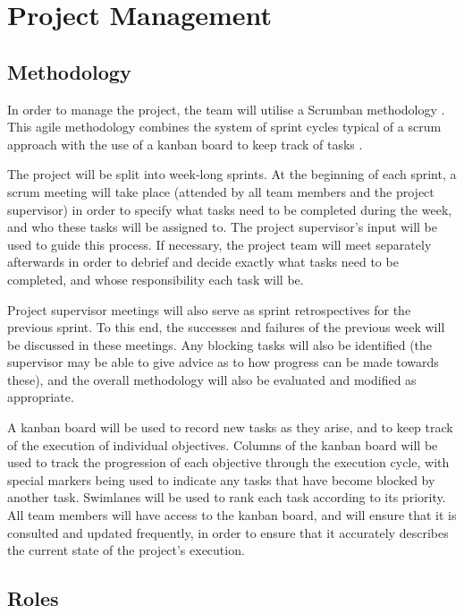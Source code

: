 \chapter{Project Management} %

\section{Methodology}

In order to manage the project, the team will utilise a Scrumban methodology \cite{ladas2009scrumban}. This agile methodology combines the system of sprint cycles typical of a scrum approach with the use of a kanban board to keep track of tasks \cite{scrum2023scrum, kanban2023agile}.  

The project will be split into week-long sprints. At the beginning of each sprint, a scrum meeting will take place (attended by all team members and the project supervisor) in order to specify what tasks need to be completed during the week, and who these tasks will be assigned to. The project supervisor's input will be used to guide this process. If necessary, the project team will meet separately afterwards in order to debrief and decide exactly what tasks need to be completed, and whose responsibility each task will be.

Project supervisor meetings will also serve as sprint retrospectives for the previous sprint. To this end, the successes and failures of the previous week will be discussed in these meetings. Any blocking tasks will also be identified (the supervisor may be able to give advice as to how progress can be made towards these), and the overall methodology will also be evaluated and modified as appropriate.

A kanban board will be used to record new tasks as they arise, and to keep track of the execution of individual objectives. Columns of the kanban board will be used to track the progression of each objective through the execution cycle, with special markers being used to indicate any tasks that have become blocked by another task. Swimlanes will be used to rank each task according to its priority. All team members will have access to the kanban board, and will ensure that it is consulted and updated frequently, in order to ensure that it accurately describes the current state of the project's execution.


\section{Roles}

